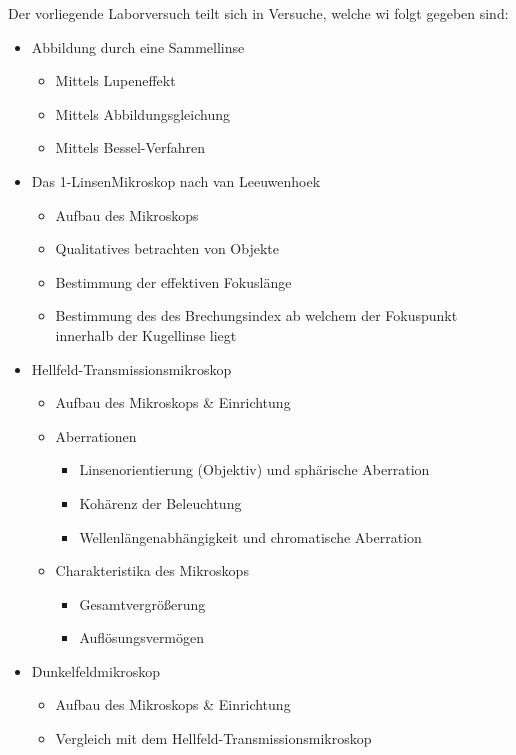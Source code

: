 \documentclass[ngerman]{scrartcl}
\begin{document}
Der vorliegende Laborversuch teilt sich in Versuche, welche wi folgt gegeben sind: 
\begin{itemize}
    \item Abbildung durch eine Sammellinse
    \begin{itemize}
        \item Mittels Lupeneffekt
        \item Mittels Abbildungsgleichung
        \item Mittels Bessel-Verfahren
    \end{itemize}
    \item Das 1-LinsenMikroskop nach van Leeuwenhoek
    \begin{itemize}
        \item Aufbau des Mikroskops
        \item Qualitatives betrachten von Objekte
        \item Bestimmung der effektiven Fokuslänge
        \item Bestimmung des des Brechungsindex ab welchem der Fokuspunkt innerhalb der Kugellinse liegt
    \end{itemize}
    \item Hellfeld-Transmissionsmikroskop
    \begin{itemize}
        \item Aufbau des Mikroskops \& Einrichtung
        \item Aberrationen 
        \begin{itemize}
            \item Linsenorientierung (Objektiv) und sphärische Aberration
            \item Kohärenz der Beleuchtung
            \item Wellenlängenabhängigkeit und chromatische Aberration
        \end{itemize}
        \item Charakteristika des Mikroskops
        \begin{itemize}
            \item Gesamtvergrößerung
            \item Auflösungsvermögen
        \end{itemize}
    \end{itemize}
    \item Dunkelfeldmikroskop
    \begin{itemize}
        \item Aufbau des Mikroskops \& Einrichtung
        \item Vergleich mit dem Hellfeld-Transmissionsmikroskop
    \end{itemize}
\end{itemize}
\end{document}
